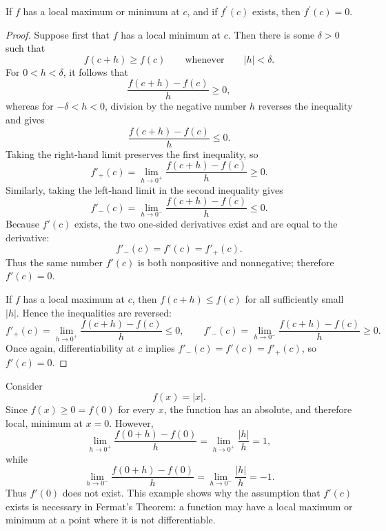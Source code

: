 \begin{theorem}
    If \(f\) has a local maximum or minimum at \(c\), and if \(f^{\prime} (c)\) exists, then \(f^{\prime} (c) = 0\).    
\end{theorem}
\begin{proof}
    Suppose first that \(f\) has a local minimum at \(c\).  Then there is
    some \(\delta>0\) such that
    \[
        f(c+h)\geq f(c)
        \qquad\text{whenever}\qquad |h|<\delta.
    \]
    For \(0<h<\delta\), it follows that
    \[
        \frac{f(c+h)-f(c)}{h}\geq0,
    \]
    whereas for \(-\delta<h<0\), division by the negative number \(h\)
    reverses the inequality and gives
    \[
        \frac{f(c+h)-f(c)}{h}\leq0.
    \]
    Taking the right-hand limit preserves the first inequality, so
    \[
        f'_+(c)
        =\lim_{h\to0^+}\frac{f(c+h)-f(c)}{h}
        \geq0.
    \]
    Similarly, taking the left-hand limit in the second inequality gives
    \[
        f'_-(c)
        =\lim_{h\to0^-}\frac{f(c+h)-f(c)}{h}
        \leq0.
    \]
    Because \(f'(c)\) exists, the two one-sided derivatives exist and are
    equal to the derivative:
    \[
        f'_-(c)=f'(c)=f'_+(c).
    \]
    Thus the same number \(f'(c)\) is both nonpositive and nonnegative;
    therefore \(f'(c)=0\).

    If \(f\) has a local maximum at \(c\), then \(f(c+h)\leq f(c)\) for
    all sufficiently small \(|h|\).  Hence the inequalities are reversed:
    \[
        f'_+(c)
        =\lim_{h\to0^+}\frac{f(c+h)-f(c)}{h}
        \leq0,
        \qquad
        f'_-(c)
        =\lim_{h\to0^-}\frac{f(c+h)-f(c)}{h}
        \geq0.
    \]
    Once again, differentiability at \(c\) implies
    \(f'_-(c)=f'(c)=f'_+(c)\), so \(f'(c)=0\).
\end{proof}

\begin{eg}
    Consider
    \[
        f(x)=|x|.
    \]
    Since \(f(x)\geq0=f(0)\) for every \(x\), the function has an absolute,
    and therefore local, minimum at \(x=0\).  However,
    \[
        \lim_{h\to0^+}\frac{f(0+h)-f(0)}{h}
        =\lim_{h\to0^+}\frac{|h|}{h}=1,
    \]
    while
    \[
        \lim_{h\to0^-}\frac{f(0+h)-f(0)}{h}
        =\lim_{h\to0^-}\frac{|h|}{h}=-1.
    \]
    Thus \(f'(0)\) does not exist.  This example shows why the assumption
    that \(f'(c)\) exists is necessary in Fermat's Theorem: a function may
    have a local maximum or minimum at a point where it is not
    differentiable.
\end{eg}

